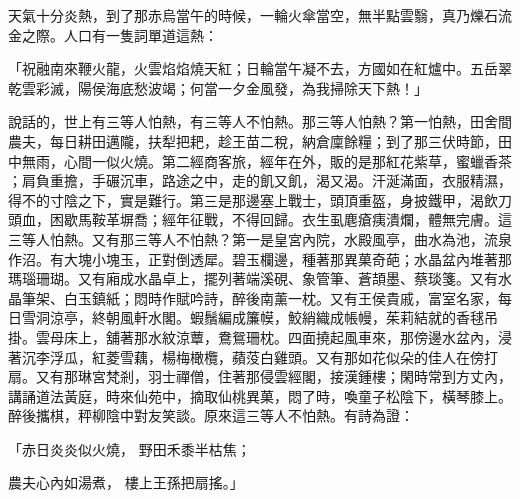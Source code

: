 天氣十分炎熱，到了那赤烏當午的時候，一輪火傘當空，無半點雲翳，真乃爍石流金之際。人口有一隻詞單道這熱：

「祝融南來鞭火龍，火雲焰焰燒天紅；日輪當午凝不去，方國如在紅爐中。五岳翠乾雲彩滅，陽侯海底愁波竭；何當一夕金風發，為我掃除天下熱！」

說話的，世上有三等人怕熱，有三等人不怕熱。那三等人怕熱？第一怕熱，田舍間農夫，每日耕田邁隴，扶犁把耙，趁王苗二稅，納倉廩餘糧；到了那三伏時節，田中無雨，心間一似火燒。第二經商客旅，經年在外，販的是那紅花紫草，蜜蠟香茶 ；肩負重擔，手碾沉車，路途之中，走的飢又飢，渴又渴。汗涎滿面，衣服精濕，得不的寸陰之下，實是難行。第三是那邊塞上戰士，頭頂重盔，身披鐵甲，渴飲刀頭血，困歇馬鞍革塀喬；經年征戰，不得回歸。衣生虱麀瘡痍潰爛，體無完膚。這三等人怕熱。又有那三等人不怕熱？第一是皇宮內院，水殿風亭，曲水為池，流泉作沼。有大塊小塊玉，正對倒透犀。碧玉欄邊，種著那異菓奇葩；水晶盆內堆著那瑪瑙珊瑚。又有廂成水晶卓上，擺列著端溪硯、象管筆、蒼頡墨、蔡琰箋。又有水晶筆架、白玉鎮紙；悶時作賦吟詩，醉後南薰一枕。又有王侯貴戚，富室名家，每日雪洞涼亭，終朝風軒水閣。蝦鬚編成簾幙，鮫綃織成帳幔，茱莉結就的香毬吊掛。雲母床上，舖著那水紋涼蕈，鴦鴛珊枕。四面撓起風車來，那傍邊水盆內，浸著沉李浮瓜，紅菱雪藕，楊梅橄欖，蘋莈白雞頭。又有那如花似朵的佳人在傍打扇。又有那琳宮梵剎，羽士禪僧，住著那侵雲經閣，接漢鍾樓；閑時常到方丈內，講誦道法黃庭，時來仙苑中，摘取仙桃異菓，悶了時，喚童子松陰下，橫琴膝上。醉後攜棋，秤柳陰中對友笑談。原來這三等人不怕熱。有詩為證：

「赤日炎炎似火燒，  野田禾黍半枯焦；

農夫心內如湯煮，  樓上王孫把扇搖。」

